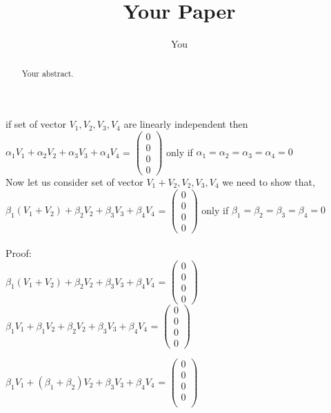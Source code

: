 \documentclass{article}
\title{Your Paper}
\author{You}
\begin{document}
\maketitle

\begin{abstract}
Your abstract.
\end{abstract}

if set of vector {$V_1,V_2,V_3,V_4$} are linearly independent then \\

$\alpha_1 V_1+\alpha_2 V_2+\alpha_3 V_3+ \alpha_4 V_4$ =
$\begin{pmatrix}
0\\0\\0\\0
\end{pmatrix}
$ only if $\alpha_1 = \alpha_2 =\alpha_3= \alpha_4=0$\\
Now let us consider set of vector ${V_1+V_2,V_2,V_3,V_4}$
we need to show that,\\

$\beta_1 (V_1+V_2)+\beta_2 V_2+\beta_3 V_3+ \beta_4 V_4$ =
$\begin{pmatrix}
0\\0\\0\\0
\end{pmatrix}
$ 
 only if $\beta_1 = \beta_2 =\beta_3= \beta_4=0$\\\\
Proof:\\
$\beta_1 (V_1+V_2)+\beta_2 V_2+\beta_3 V_3+ \beta_4 V_4$ =
$\begin{pmatrix}
0\\0\\0\\0
\end{pmatrix}
$ \\

$\beta_1 V_1+ \beta_1 V_2+\beta_2 V_2+\beta_3 V_3+ \beta_4 V_4$ =
$\begin{pmatrix}
0\\0\\0\\0
\end{pmatrix}
$ 

$\beta_1 V_1+ (\beta_1 +\beta_2) V_2+\beta_3 V_3+ \beta_4 V_4$ =
$\begin{pmatrix}
0\\0\\0\\0\\
\end{pmatrix}$
\end{document}
